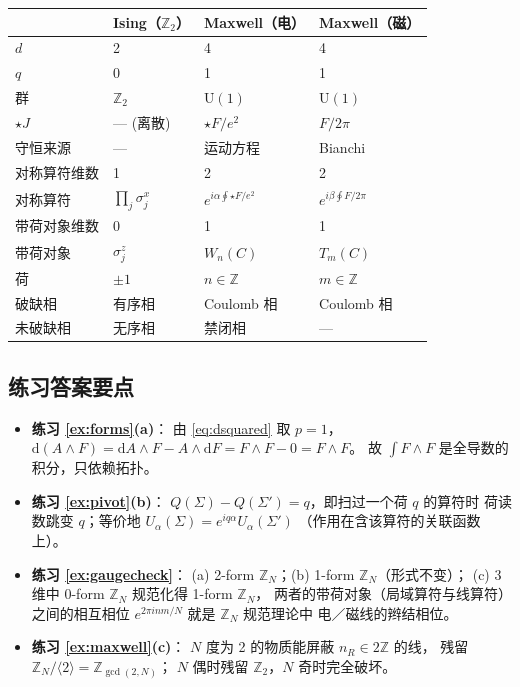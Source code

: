 \documentclass[UTF8,a4paper,11pt]{ctexart}
\theoremstyle{plain}
\theoremstyle{definition}
\theoremstyle{remark}
\newcommand{\ext}{\mathrm{d}}          %
\newcommand{\hs}{\star}                %
\newcommand{\ZZ}{\mathbb{Z}}
\newcommand{\Uone}{\mathrm{U}(1)}
\newcommand{\Ssurf}{\Sigma}
\newcommand{\Uop}{U}
\begin{document}
\begin{center}
\begin{tabular}{@{}llll@{}}
\toprule
 & Ising（$\ZZ_2$） & Maxwell（电） & Maxwell（磁）\\
\midrule
$d$ & 2 & 4 & 4 \\
$q$ & 0 & 1 & 1 \\
群 & $\ZZ_2$ & $\Uone$ & $\Uone$ \\
$\hs J$ & --- (离散) & $\hs F/e^2$ & $F/2\pi$ \\
守恒来源 & --- & 运动方程 & Bianchi \\
对称算符维数 & 1 & 2 & 2 \\
对称算符 & $\prod_j\sigma^x_j$
  & $e^{i\alpha\oint\hs F/e^2}$ & $e^{i\beta\oint F/2\pi}$ \\
带荷对象维数 & 0 & 1 & 1 \\
带荷对象 & $\sigma^z_j$ & $W_n(C)$ & $T_m(C)$ \\
荷 & $\pm1$ & $n\in\ZZ$ & $m\in\ZZ$ \\
破缺相 & 有序相 & Coulomb 相 & Coulomb 相 \\
未破缺相 & 无序相 & 禁闭相 & --- \\
\bottomrule
\end{tabular}
\end{center}

\subsection{练习答案要点}

\begin{itemize}
  \item \textbf{练习 \ref{ex:forms}(a)}：
        由 \eqref{eq:dsquared} 取 $p=1$，
        $\ext(A\wedge F)=\ext A\wedge F-A\wedge \ext F
        =F\wedge F-0=F\wedge F$。
        故 $\int F\wedge F$ 是全导数的积分，只依赖拓扑。
  \item \textbf{练习 \ref{ex:pivot}(b)}：
        $Q(\Ssurf)-Q(\Ssurf')=q$，即扫过一个荷 $q$ 的算符时
        荷读数跳变 $q$；等价地
        $\Uop_\alpha(\Ssurf)=e^{iq\alpha}\Uop_\alpha(\Ssurf')$
        （作用在含该算符的关联函数上）。
  \item \textbf{练习 \ref{ex:gaugecheck}}：
        (a) 2-form $\ZZ_N$；(b) 1-form $\ZZ_N$（形式不变）；
        (c) 3 维中 0-form $\ZZ_N$ 规范化得 1-form $\ZZ_N$，
        两者的带荷对象（局域算符与线算符）之间的相互相位
        $e^{2\pi i nm/N}$ 就是 $\ZZ_N$ 规范理论中
        电／磁线的辫结相位。
  \item \textbf{练习 \ref{ex:maxwell}(c)}：
        $N$ 度为 2 的物质能屏蔽 $n_R\in2\ZZ$ 的线，
        残留 $\ZZ_N/\langle 2\rangle=\ZZ_{\gcd(2,N)}$；
        $N$ 偶时残留 $\ZZ_2$，$N$ 奇时完全破坏。
\end{itemize}
\end{document}
